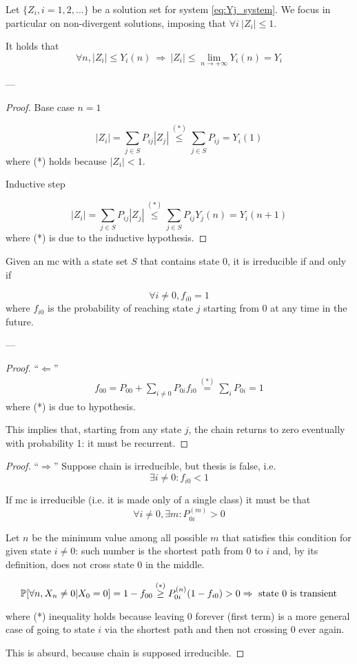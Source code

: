 	\begin{lemma}
		Let $\{Z_i, i=1, 2, ...\}$ be a solution set for system \ref{eq:Yj_system}. We focus in particular on non-divergent solutions, imposing that $ \forall i ~ |Z_i| \le 1 $.

		It holds that
		$$ \forall n, |Z_i| \le Y_i(n) ~ \Rightarrow ~|Z_i| \le \lim_{n \to +\infty} Y_i(n) = Y_i $$
	\end{lemma}
	---
	\begin{proof}
		\proofpart Base case $n=1$

		$$ |Z_i| = \sum_{j \in S} P_{ij} |Z_j| \stackrel{(*)}{\le} \sum_{j \in S} P_{ij} = Y_i(1) $$
		where (*) holds because $|Z_i| < 1$.

		\proofpart Inductive step

		$$ |Z_i| = \sum_{j \in S} P_{ij} |Z_j| \stackrel{(*)}{\le} \sum_{j \in S} P_{ij} Y_j(n) = Y_i(n+1) $$
		where (*) is due to the inductive hypothesis.
	\end{proof}

	\begin{lemma}[Ross 2, pg. 78-82] \label{lemma:MC_irreducible_fi0}
		Given an \gls{mc} with a state set $S$ that contains state 0, it is irreducible if and only if

		$$ \forall i \neq 0, f_{i 0} = 1 $$
		where $f_{i 0}$ is the probability of reaching state $j$ starting from 0 at any time in the future.
	\end{lemma}
	---
	\begin{proof} ``$\Leftarrow$''
		\begin{equation}\begin{split}
			f_{00} = P_{00} + \sum_{i \neq 0} P_{0i} f_{i 0} \stackrel{(*)}{=} \sum_{i} P_{0i} = 1
		\end{split}\end{equation}
		where (*) is due to hypothesis.

		This implies that, starting from any state $j$, the chain returns to zero eventually with probability 1: it must be recurrent.
	\end{proof}

	\begin{proof} ``$\Rightarrow$''
		Suppose chain is irreducible, but thesis is false, i.e.
		$$ \exists i \neq 0 : f_{i0} < 1 $$

		If \gls{mc} is irreducible (i.e. it is made only of a single class) it must be that
		$$ \forall i \neq 0, \exists m : P_{0i}^{(m)} > 0 $$

		Let $n$ be the minimum value among all possible $m$  that satisfies this condition for given state $i \neq 0$: such number is the shortest path from 0 to $i$ and, by its definition, does not cross state 0 in the middle.

		$$ \mathbb{P}[\forall n, X_n \neq 0 | X_0 = 0] = 1 - f_{00} \stackrel{(*)}{\ge} P_{0i}^{(n)} (1 - f_{i0}) > 0 \Rightarrow \text{ state 0 is transient} $$

		where (*) inequality holds because leaving 0 forever (first term) is a more general case of going to state $i$ via the shortest path and then not crossing 0 ever again.

		This is absurd, because chain is supposed irreducible.
	\end{proof}

